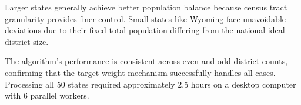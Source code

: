 Larger states generally achieve better population balance because census tract granularity provides finer control. Small states like Wyoming face unavoidable deviations due to their fixed total population differing from the national ideal district size.

The algorithm's performance is consistent across even and odd district counts, confirming that the target weight mechanism successfully handles all cases. Processing all 50 states required approximately 2.5 hours on a desktop computer with 6 parallel workers.
